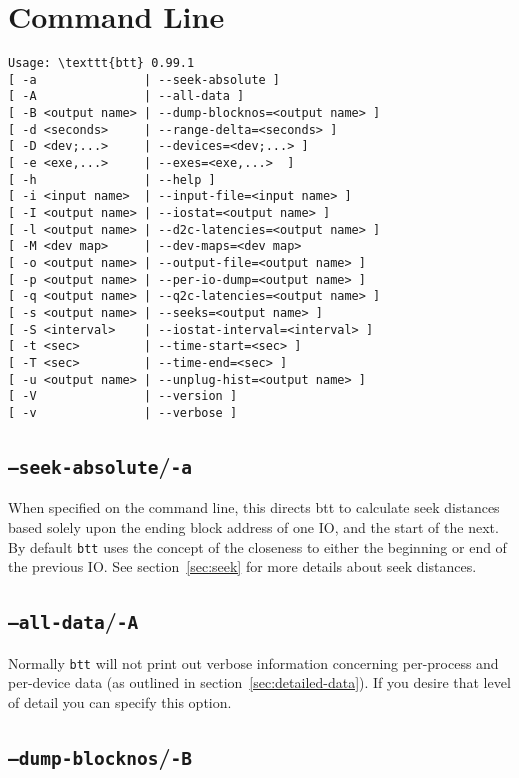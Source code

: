 \documentclass{article}
\begin{document}
\newpage\section{\label{sec:cmd-line}Command Line}

\begin{verbatim}
Usage: \texttt{btt} 0.99.1 
[ -a               | --seek-absolute ]
[ -A               | --all-data ]
[ -B <output name> | --dump-blocknos=<output name> ]
[ -d <seconds>     | --range-delta=<seconds> ]
[ -D <dev;...>     | --devices=<dev;...> ]
[ -e <exe,...>     | --exes=<exe,...>  ]
[ -h               | --help ]
[ -i <input name>  | --input-file=<input name> ]
[ -I <output name> | --iostat=<output name> ]
[ -l <output name> | --d2c-latencies=<output name> ]
[ -M <dev map>     | --dev-maps=<dev map>
[ -o <output name> | --output-file=<output name> ]
[ -p <output name> | --per-io-dump=<output name> ]
[ -q <output name> | --q2c-latencies=<output name> ]
[ -s <output name> | --seeks=<output name> ]
[ -S <interval>    | --iostat-interval=<interval> ]
[ -t <sec>         | --time-start=<sec> ]
[ -T <sec>         | --time-end=<sec> ]
[ -u <output name> | --unplug-hist=<output name> ] 
[ -V               | --version ]
[ -v               | --verbose ]
\end{verbatim}

\subsection{\label{sec:o-a}\texttt{--seek-absolute}/\texttt{-a}}

  When specified on the command line, this directs btt to calculate
  seek distances based solely upon the ending block address of one IO,
  and the start of the next.  By default \texttt{btt} uses the concept
  of the closeness to either the beginning or end of the previous IO. See
  section~\ref{sec:seek} for more details about seek distances.

\subsection{\label{sec:o-A}\texttt{--all-data}/\texttt{-A}}

  Normally \texttt{btt} will not print out verbose information
  concerning per-process and per-device data (as outlined in
  section~\ref{sec:detailed-data}). If you desire that level of 
  detail you can specify this option.

\subsection{\label{sec:o-B}\texttt{--dump-blocknos}/\texttt{-B}}
\end{document}
